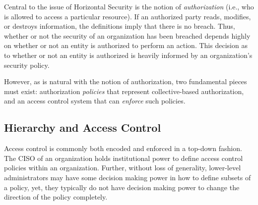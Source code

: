 
Central to the issue of Horizontal Security is the notion of
\emph{authorization} (i.e., who is allowed to access a particular resource). If
an authorized party reads, modifies, or destroys information, the definitions
imply that there is no breach. Thus, whether or not the security of an
organization has been breached depends highly on whether or not an entity is
authorized to perform an action. This decision as to whether or not an entity is
authorized is heavily informed by an organization's security policy.



%

However, as is natural with the notion of authorization, two fundamental pieces
must exist: authorization \emph{policies} that represent collective-based
authorization, and an access control system that can \emph{enforce} such
policies.

\subsection{Hierarchy and Access Control}
\label{sec:definition}

Access control is commonly both encoded and enforced in a top-down fashion. The
CISO of an organization holds institutional power to define access control
policies within an organization. Further, without loss of generality,
lower-level administrators may have some decision making power in how to define
subsets of a policy, yet, they typically do not have decision making power to
change the direction of the policy completely. 

